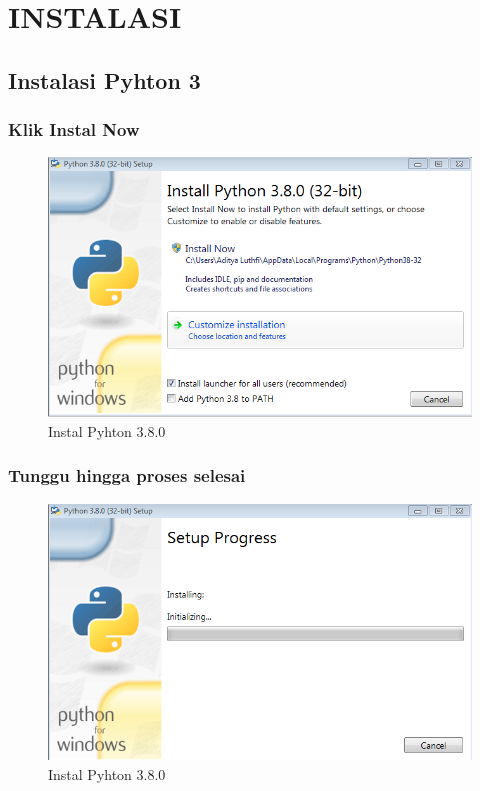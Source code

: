 \documentclass[12pt, times new roman, a4paper]{article}
\begin{document}
\section{INSTALASI}

\subsection{Instalasi Pyhton 3}

\subsubsection{Klik Instal Now}
	\begin{figure}[h]
		\centering
		\includegraphics[scale=0.7]{Gambar/p1}
		\caption{Instal Pyhton 3.8.0}
	\end{figure}
\subsubsection{Tunggu hingga proses selesai}
	\begin{figure}[h]
		\centering
		\includegraphics[scale=0.55]{Gambar/p2}
		\caption{Instal Pyhton 3.8.0}
	\end{figure}
\end{document}
